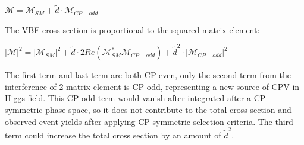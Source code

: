 \begin{center}
\begin{math}
\mathcal{M}=\mathcal{M}_{SM}+\tilde{d}\cdot\mathcal{M}_{CP-odd} 
\end{math}
\end{center}

The VBF cross section is proportional to the squared matrix element: 

\begin{center}
\begin{math}
|\mathcal{M}|^2 = |\mathcal{M}_{SM}|^2 + \tilde{d}\cdot2 Re(\mathcal{M}^{\ast}_{SM} \mathcal{M}_{CP-odd}) + \tilde{d}^2\cdot|\mathcal{M}_{CP-odd}|^2
\end{math}
\end{center}

The first term and last term are both CP-even, only the second term from the interference of 2 matrix element is CP-odd, representing a new source of CPV in Higgs field. This CP-odd term would vanish after integrated after a CP-symmetric phase space, so it does not contribute to the total cross section and observed event yields after applying CP-symmetric selection criteria. The third term could increase the total cross section by an amount of $\tilde{d}^2$. 

